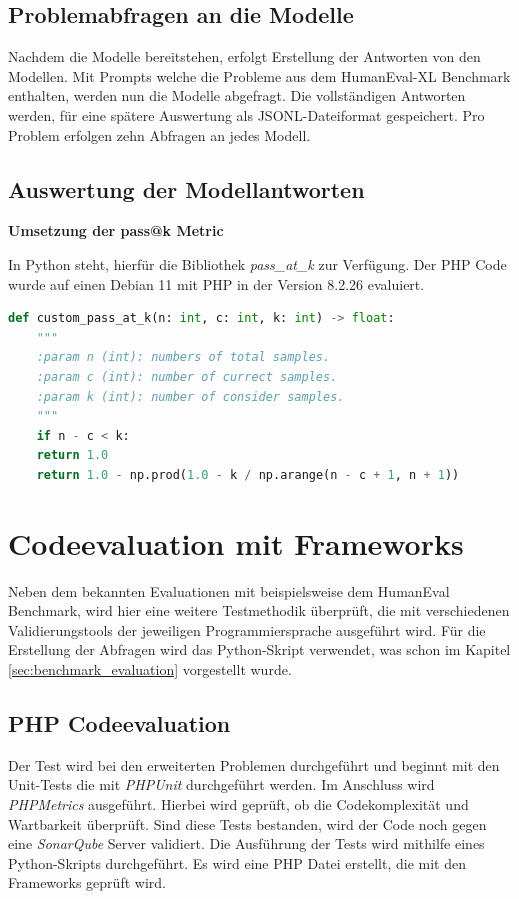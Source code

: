 \subsection{Problemabfragen an die Modelle}
Nachdem die Modelle bereitstehen, erfolgt Erstellung der Antworten von den Modellen. Mit Prompts welche die Probleme aus dem HumanEval-XL Benchmark enthalten, werden nun die Modelle abgefragt. Die vollständigen Antworten werden, für eine spätere Auswertung als JSONL-Dateiformat gespeichert. Pro Problem erfolgen zehn Abfragen an jedes Modell.


\subsection{Auswertung der Modellantworten}

\textbf{Umsetzung der pass@k Metric}\vspace{0.2cm}

In Python steht, hierfür die Bibliothek \textit{pass\_at\_k} zur Verfügung. Der PHP Code wurde auf einen Debian 11 mit PHP in der Version 8.2.26 evaluiert.

\begin{lstlisting}[language=Python,label=lst:pass_at_k,caption={Berechnung der pass@k Metrik in Python}]
	def custom_pass_at_k(n: int, c: int, k: int) -> float:
	"""
	:param n (int): numbers of total samples.
	:param c (int): number of currect samples.
	:param k (int): number of consider samples.
	"""
	if n - c < k:
	return 1.0
	return 1.0 - np.prod(1.0 - k / np.arange(n - c + 1, n + 1))
\end{lstlisting}


\section{Codeevaluation mit Frameworks}
Neben dem bekannten Evaluationen mit beispielsweise dem HumanEval Benchmark, wird hier eine weitere Testmethodik überprüft, die mit verschiedenen Validierungstools der jeweiligen Programmiersprache ausgeführt wird. Für die Erstellung der Abfragen wird das Python-Skript verwendet, was schon im Kapitel \ref{sec:benchmark_evaluation} vorgestellt wurde.

\subsection{PHP Codeevaluation}
Der Test wird bei den erweiterten Problemen durchgeführt und beginnt mit den Unit-Tests die mit \textit{PHPUnit} durchgeführt werden. Im Anschluss wird \textit{PHPMetrics} ausgeführt. Hierbei wird geprüft, ob die Codekomplexität und Wartbarkeit überprüft. Sind diese Tests bestanden, wird der Code noch gegen eine \textit{SonarQube} Server validiert. Die Ausführung der Tests wird mithilfe eines Python-Skripts durchgeführt. Es wird eine PHP Datei erstellt, die mit den Frameworks geprüft wird.

